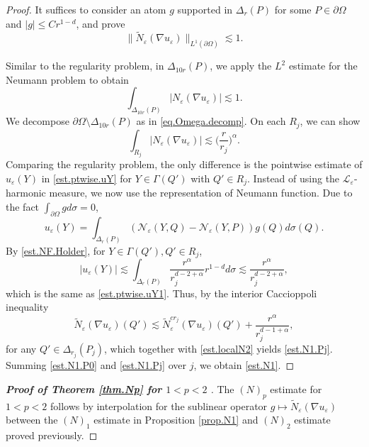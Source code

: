 \documentclass[reqno,12pt]{amsart} %
\theoremstyle{definition}
\theoremstyle{remark}
\numberwithin{equation}{section}
\newcommand{\cL}{\mathcal{L}}
\newcommand{\e}{\varepsilon}
\begin{document}
\begin{proof}
It suffices to consider an atom $g$ supported in $\Delta_r(P)$ for some $P\in \partial \Omega$ and $|g| \le Cr^{1-d}$, and prove
\begin{equation}\label{est.N1}
    \| \widetilde{N}_\e(\nabla u_\e) \|_{L^1(\partial \Omega)} \lesssim 1.
\end{equation}

Similar to the regularity problem, in $\Delta_{10r}(P)$, we apply the $L^2$ estimate for the Neumann problem to obtain
\begin{equation}\label{est.N1.P0}
    \int_{\Delta_{10r}(P)} |N_\e(\nabla u_\e)| \lesssim 1.
\end{equation}
We decompose $\partial \Omega \setminus \Delta_{10r}(P)$ as in \eqref{eq.Omega.decomp}. On each $R_j$, we can show
\begin{equation}\label{est.N1.Pj}
    \int_{R_j} |N_\e(\nabla u_\e)| \lesssim \Big( \frac{r}{r_j} \Big)^\alpha.
\end{equation}
Comparing the regularity problem, the only difference is the pointwise estimate of $u_\e(Y)$ in \eqref{est.ptwise.uY} for $Y \in \Gamma(Q')$ with $Q' \in R_j$. Instead of using the $\cL_\e$-harmonic measure, we now use the representation of Neumann function. Due to the fact $\int_{\partial \Omega} g d\sigma = 0$,
\begin{equation}
    u_\e(Y) = \int_{\Delta_r(P)} (\mathcal{N}_\e(Y,Q) - \mathcal{N}_\e(Y,P)) g(Q) d\sigma(Q).
\end{equation}
By \eqref{est.NF.Holder}, for $Y\in \Gamma(Q'), Q'\in R_j$,
\begin{equation}
    |u_\e(Y)| \lesssim \int_{\Delta_r(P)} \frac{r^\alpha}{r_j^{d-2+\alpha}} r^{1-d} d\sigma \lesssim \frac{r^\alpha}{r_j^{d-2+\alpha}},
\end{equation}
which is the same as \eqref{est.ptwise.uY1}. Thus, by the interior Caccioppoli inequality 
\begin{equation}
    \widetilde{N}_\e(\nabla u_\e)(Q') \lesssim \widetilde{N}_\e^{cr_j}(\nabla u_\e)(Q') + \frac{r^\alpha}{r_j^{d-1+\alpha}},
\end{equation}
for any $Q'\in \Delta_{r_j}(P_j)$, which together with \eqref{est.localN2} yields \eqref{est.N1.Pj}. Summing \eqref{est.N1.P0} and \eqref{est.N1.Pj} over $j$, we obtain \eqref{est.N1}. 
\end{proof}


\begin{proof}[\textbf{Proof of Theorem \ref{thm.Np} for $1<p<2$} ]
The $(N)_p$ estimate for $1<p<2$ follows by interpolation for the sublinear operator $g \mapsto \widetilde{N}_\e(\nabla u_\e)$ between the $(N)_1$ estimate in Proposition \eqref{prop.N1} and $(N)_2$ estimate proved previously.
\end{proof}
\end{document}
